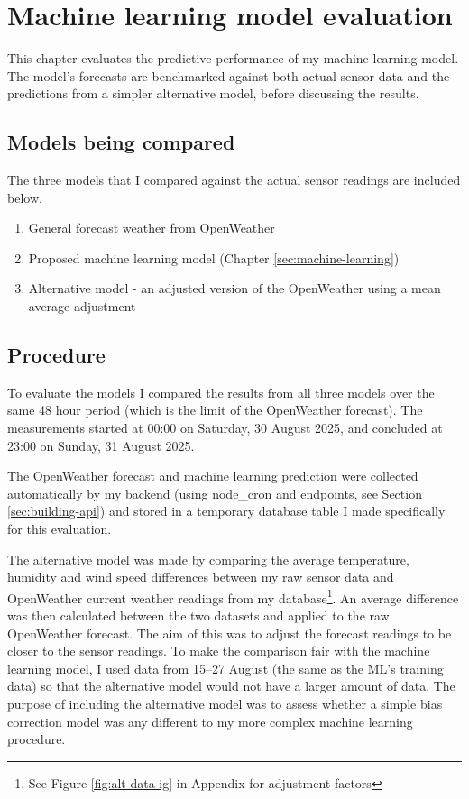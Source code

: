 \section{Machine learning model evaluation}\label{sec:mach-learn-eval}

This chapter evaluates the predictive performance of my machine learning model.
The model's forecasts are benchmarked against both actual sensor data and the
predictions from a simpler alternative model, before discussing the results.

\subsection{Models being compared}

The three models that I compared against the actual sensor readings are included
below.

\begin{enumerate}
    \item{General forecast weather from OpenWeather} 
    \item{Proposed machine learning model (Chapter \ref{sec:machine-learning})} 
    \item{Alternative model - an adjusted version of the OpenWeather using a mean average adjustment}
\end{enumerate}

\subsection{Procedure}

To evaluate the models I compared the results from all three models over the
same 48 hour period (which is the limit of the OpenWeather forecast). The
measurements started at 00:00 on Saturday, 30 August 2025, and concluded at
23:00 on Sunday, 31 August 2025. 

The OpenWeather forecast and machine learning prediction were collected
automatically by my backend (using node\_cron and endpoints, see Section
\ref{sec:building-api}) and stored in a temporary database table I made
specifically for this evaluation.

The alternative model was made by comparing the average temperature, humidity
and wind speed differences between my raw sensor data and OpenWeather current
weather readings from my database\footnote{See Figure \ref{fig:alt-data-ig} in
Appendix for adjustment factors}. An average difference was then calculated
between the two datasets and applied to the raw OpenWeather forecast. The aim of
this was to adjust the forecast readings to be closer to the sensor readings. To
make the comparison fair with the machine learning model, I used data from
15--27 August (the same as the ML's training data) so that the alternative model
would not have a larger amount of data. The purpose of including the alternative
model was to assess whether a simple bias correction model was any different to
my more complex machine learning procedure.

